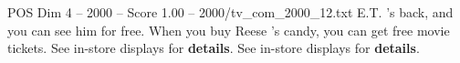 \begin{textsample}{POS Dim 4 – 2000 – Score 1.00 – 2000/tv\_com\_2000\_12.txt}  \label{ex:f4_pos_080}
E.T. 's back, and you can see him for free.
When you buy Reese 's candy, you can get free movie tickets.
See in-store displays for \textbf{details}.
See in-store displays for \textbf{details}.

\end{textsample}
